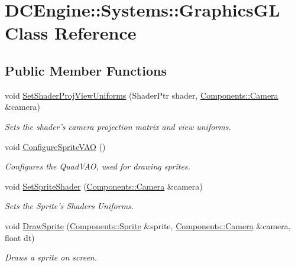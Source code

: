 \hypertarget{classDCEngine_1_1Systems_1_1GraphicsGL}{\section{D\-C\-Engine\-:\-:Systems\-:\-:Graphics\-G\-L Class Reference}
\label{classDCEngine_1_1Systems_1_1GraphicsGL}
}
\subsection*{Public Member Functions}
\begin{DoxyCompactItemize}
\item 
void \hyperlink{classDCEngine_1_1Systems_1_1GraphicsGL_a00f71aa67801d3266d86ac02aa021245}{Set\-Shader\-Proj\-View\-Uniforms} (Shader\-Ptr shader, \hyperlink{classDCEngine_1_1Components_1_1Camera}{Components\-::\-Camera} \&camera)
\begin{DoxyCompactList}\small\item\em Sets the shader's camera projection matrix and view uniforms. \end{DoxyCompactList}\item 
void \hyperlink{classDCEngine_1_1Systems_1_1GraphicsGL_afb01f98dc0066583641c8abd0dfe5806}{Configure\-Sprite\-V\-A\-O} ()
\begin{DoxyCompactList}\small\item\em Configures the Quad\-V\-A\-O, used for drawing sprites. \end{DoxyCompactList}\item 
void \hyperlink{classDCEngine_1_1Systems_1_1GraphicsGL_aa95e1290ceecd1d01deed36f21522613}{Set\-Sprite\-Shader} (\hyperlink{classDCEngine_1_1Components_1_1Camera}{Components\-::\-Camera} \&camera)
\begin{DoxyCompactList}\small\item\em Sets the Sprite's Shaders Uniforms.  \end{DoxyCompactList}\item 
void \hyperlink{classDCEngine_1_1Systems_1_1GraphicsGL_a431bfb80d5ec91de3c1e3f1a2c9c27ab}{Draw\-Sprite} (\hyperlink{classDCEngine_1_1Components_1_1Sprite}{Components\-::\-Sprite} \&sprite, \hyperlink{classDCEngine_1_1Components_1_1Camera}{Components\-::\-Camera} \&camera, float dt)
\begin{DoxyCompactList}\small\item\em Draws a sprite on screen. \end{DoxyCompactList}\item 

\end{DoxyCompactItemize}
